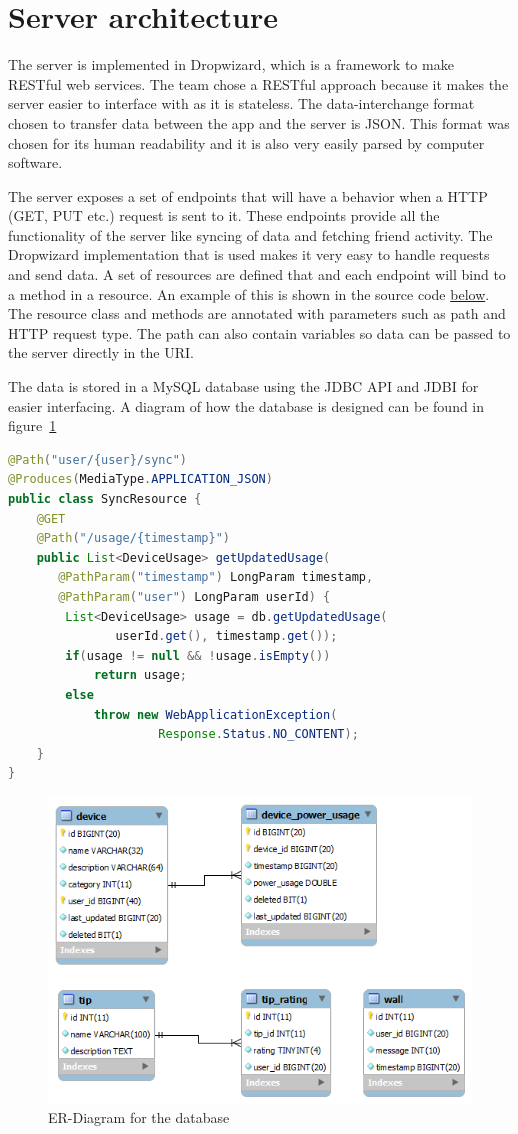 \section{Server architecture}
The server is implemented in Dropwizard, which is a framework to make RESTful web services. The team chose a RESTful approach because it makes the server easier to interface with as it is stateless. The data-interchange format chosen to transfer data between the app and the server is JSON. This format was chosen for its human readability and it is also very easily parsed by computer software.

The server exposes a set of endpoints that will have a behavior when a HTTP (GET, PUT etc.) request is sent to it. These endpoints provide all the functionality of the server like syncing of data and fetching friend activity. The Dropwizard implementation that is used makes it very easy to handle requests and send data. A set of resources are defined that and each endpoint will bind to a method in a resource. An example of this is shown in the source code \hyperref[lst:dropwizardResource]{below}. The resource class and methods are annotated with parameters such as path and HTTP request type. The path can also contain variables so data can be passed to the server directly in the URI. 

The data is stored in a MySQL database using the JDBC API and JDBI for easier interfacing. A diagram of how the database is designed can be found in figure~\ref{fig:ER-Diagram}


\begin{lstlisting}[language=java, frame=single, breaklines=true, caption={Dropwizard resource example}, label={lst:dropwizardResource}]
@Path("user/{user}/sync")
@Produces(MediaType.APPLICATION_JSON)
public class SyncResource {
    @GET
    @Path("/usage/{timestamp}")
    public List<DeviceUsage> getUpdatedUsage(
	   @PathParam("timestamp") LongParam timestamp, 
	   @PathParam("user") LongParam userId) {
        List<DeviceUsage> usage = db.getUpdatedUsage(
		       userId.get(), timestamp.get());
        if(usage != null && !usage.isEmpty())
            return usage;
        else
            throw new WebApplicationException(
			         Response.Status.NO_CONTENT);
    }
}
\end{lstlisting}

\begin{figure}[H]
\includegraphics[width=\textwidth]{ch/architecture/fig/ER-Diagram.png}
\caption{ER-Diagram for the database}
\label{fig:ER-Diagram}
\end{figure}